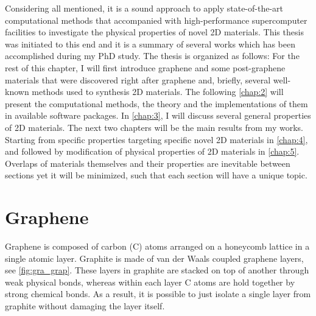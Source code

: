Considering all mentioned, it is a sound approach to apply state-of-the-art computational methods that accompanied with high-performance supercomputer facilities to investigate the physical properties of novel 2D materials. This thesis was initiated to this end and it is a summary of several works which has been accomplished during my PhD study. The thesis is organized as follows: For the rest of this chapter, I will first introduce graphene and some post-graphene materials that were discovered right after graphene and, briefly, several well-known methods used to synthesis 2D materials. The following \autoref{chap:2} will present the computational methods, the theory and the implementations of them in available software packages. In \autoref{chap:3}, I will discuss several general properties of 2D materials. The next two chapters will be the main results from my works. Starting from specific properties targeting specific novel 2D materials in \autoref{chap:4}, and followed by modification of physical properties of 2D materials in \autoref{chap:5}. Overlaps of materials themselves and their properties are inevitable between sections yet it will be minimized, such that each section will have a unique topic. 



\section{Graphene}

Graphene is composed of carbon (C) atoms arranged on a honeycomb lattice in a single atomic layer. Graphite is made of van der Waals coupled graphene layers, see \autoref{fig:gra_grap}. These layers in graphite are stacked on top of another through weak physical bonds, whereas within each layer C atoms are hold together by strong chemical bonds. As a result, it is possible to just isolate a single layer from graphite without damaging the layer itself. 


